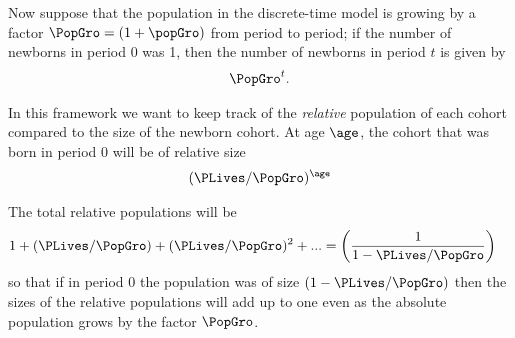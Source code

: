 \documentclass{handout}
\begin{document}
Now suppose that the population in the discrete-time model is growing by a factor $\PopGro=(1+\popGro)$ from period to period; if the number of newborns in period 0 was 1, then the number of newborns in period $t$ is given by 
\begin{equation}\begin{gathered}\begin{aligned}
  \PopGro^{t}.
\end{aligned}\end{gathered}\end{equation}

In this framework we want to keep track of the {\it relative} population of each cohort compared 
to the size of the newborn cohort.  At age $\age$, the cohort that was born in period 0
will be of relative size
\begin{equation}\begin{gathered}\begin{aligned}
  (\PLives/\PopGro)^{\age}
\end{aligned}\end{gathered}\end{equation}

The total relative populations will be 
\begin{equation}\begin{gathered}\begin{aligned}
  \label{eq:4}
  1 + (\PLives/\PopGro) + (\PLives/\PopGro)^{2} + ... & =  \left(\frac{1}{1-\PLives/\PopGro}\right)
\end{aligned}\end{gathered}\end{equation}
so that if in period 0 the population was of size $(1-\PLives/\PopGro)$ then the sizes
of the relative populations will add up to one even as the absolute population grows by
the factor $\PopGro$.


\end{document}
